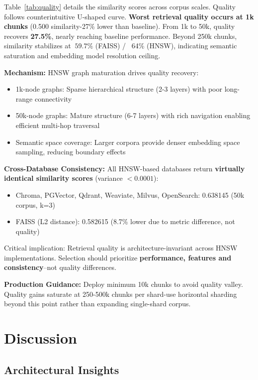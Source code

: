 \documentclass{article}
\begin{document}
Table~\ref{tab:quality} details the similarity scores across corpus scales. Quality follows counterintuitive U-shaped curve. \textbf{Worst retrieval quality occurs at 1k chunks} (0.500 similarity-27\% lower than baseline). From 1k to 50k, quality recovers \textbf{27.5\%}, nearly reaching baseline performance. Beyond 250k chunks, similarity stabilizes at $~59.7\%$ (FAISS) / ~64\% (HNSW), indicating semantic saturation and embedding model resolution ceiling.

\textbf{Mechanism:} HNSW graph maturation drives quality recovery:
\begin{itemize}
    \item 1k-node graphs: Sparse hierarchical structure (2-3 layers) with poor long-range connectivity
    \item 50k-node graphs: Mature structure (6-7 layers) with rich navigation enabling efficient multi-hop traversal
    \item Semantic space coverage: Larger corpora provide denser embedding space sampling, reducing boundary effects
\end{itemize}
\textbf{Cross-Database Consistency:} All HNSW-based databases return \textbf{virtually identical similarity scores} (variance $<0.0001$):
\begin{itemize}
    \item Chroma, PGVector, Qdrant, Weaviate, Milvus, OpenSearch: 0.638145 (50k corpus, k=3)
    \item FAISS (L2 distance): 0.582615 (8.7\% lower due to metric difference, not quality)
\end{itemize}

Critical implication: Retrieval quality is architecture-invariant across HNSW implementations. Selection should prioritize \textbf{performance, features and consistency}--not quality differences.

\textbf{Production Guidance:} Deploy minimum 10k chunks to avoid quality valley. Quality gains saturate at 250-500k chunks per shard-use horizontal sharding beyond this point rather than expanding single-shard corpus.

\section{Discussion}
\label{sec: discussion}

\subsection{Architectural Insights}
\end{document}
